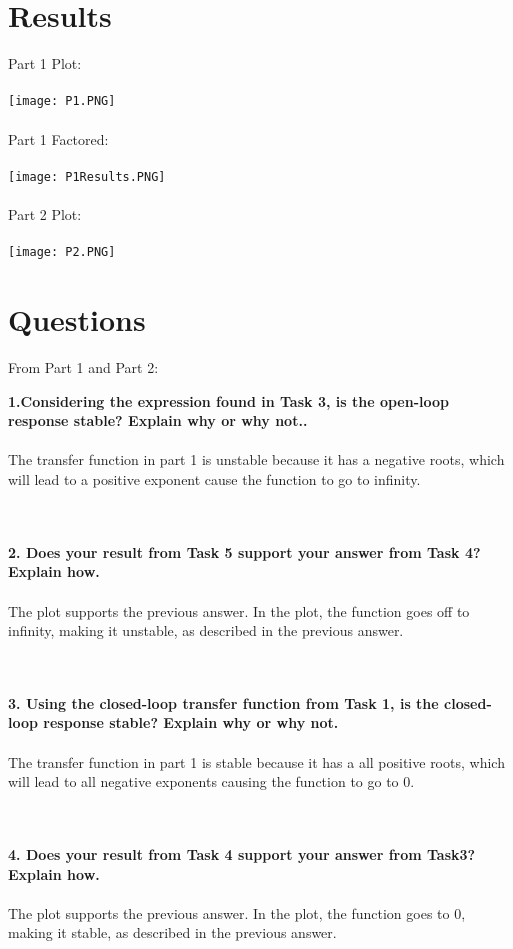 \documentclass[12pt]{report}
\begin{document}
\section{Results}
Part 1 Plot:
\\
\\ \texttt{[image: P1.PNG]}
\\
\\ Part 1 Factored:
\\
\\ \texttt{[image: P1Results.PNG]}
\\
\\Part 2 Plot:
\\
\\ \texttt{[image: P2.PNG]}


\section{Questions}

From Part 1 and Part 2:

\textbf{1.Considering the expression found in Task 3, is the open-loop response stable? Explain why or why not..}
\\ \\The transfer function in part 1 is unstable because it has a negative roots, which will lead to a positive exponent cause the function to go to infinity. 

\\ \\ \textbf{2. Does your result from Task 5 support your answer from Task 4? Explain how.}
\\ \\ The plot supports the previous answer. In the plot, the function goes off to infinity, making it unstable, as described in the previous answer. 

\\ \\\textbf{3. Using the closed-loop transfer function from Task 1, is the closed-loop response stable? Explain why or why not.}
\\ \\The transfer function in part 1 is stable because it has a all positive roots, which will lead to all negative exponents causing the function to go to 0.

\\ \\ \textbf{4. Does your result from Task 4 support your answer from Task3? Explain how.}
\\ \\ The plot supports the previous answer. In the plot, the function goes to 0, making it stable, as described in the previous answer.
\end{document}
